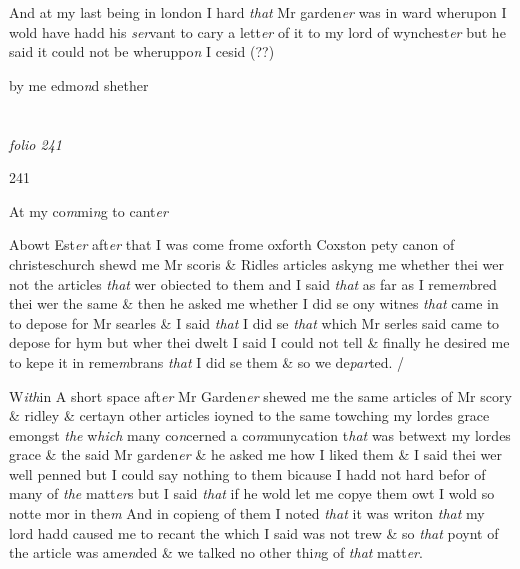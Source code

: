 \documentclass[12pt, a4paper]{book}
\begin{document}
		\ifthenelse{\isodd{\thepage}}
		{\reversemarginpar}
		{\normalmarginpar}
		And at my last being in london I hard \textit{that} Mr garden\textit{er} was in ward
            				wherupon I wold have hadd his \textit{ser}vant to cary a lett\textit{er} of it to my lord of wynchest\textit{er} but he said it could not be wheruppo\textit{n} I cesid (??)


		\ifthenelse{\isodd{\thepage}}
		{\reversemarginpar}
		{\normalmarginpar}
		by me edmo\textit{n}d shether

\dotfill
						\newpage {} \section*{}  \subsection*{}

\textit{folio 241}



\begin{flushright}{\color{Mahogany}241}\end{flushright}

		\ifthenelse{\isodd{\thepage}}
		{\reversemarginpar}
		{\normalmarginpar}
		At my co\textit{m}mi\textit{n}g to cant\textit{er}

            		
		\ifthenelse{\isodd{\thepage}}
		{\reversemarginpar}
		{\normalmarginpar}
		Abowt Est\textit{er} aft\textit{er} that I was come frome oxforth Coxston pety canon of 
            			christeschurch shewd me Mr scoris \& Ridles articles askyng me whether
thei wer not the articles \textit{that} wer obiected to them and I said \textit{that} as 
far as I reme\textit{m}bred thei wer the same \& then he asked me whether
            			I did se ony witnes \textit{that} came in to depose for Mr searles \& I said
\textit{that} I did se \textit{that} which Mr serles said came to depose for hym but 
wher thei dwelt I said I could not tell \& finally he desired me
to kepe it in reme\textit{m}brans \textit{that} I did se them \& so we de\textit{par}ted. /

            		
		\ifthenelse{\isodd{\thepage}}
		{\reversemarginpar}
		{\normalmarginpar}
		W\textit{ith}in A short space aft\textit{er} Mr Garden\textit{er} shewed me the same articles of Mr
	scory \& ridley \& certayn other articles ioyned to the same towching
	my lordes grace emongst \textit{the} w\textit{hich} many co\textit{n}cerned a co\textit{m}munycation t\textit{hat} 
            			was betwext my lordes grace \& the said Mr garden\textit{er} \& he asked me
how I liked them \& I said thei wer well penned but I could say
nothing to them bicause I hadd not hard befor of many of \textit{the} matt\textit{er}s
but I said \textit{that} if he wold let me copye them owt I wold so notte mor in the\textit{m}
And in copieng of them I noted \textit{that} it was writon \textit{that} my lord hadd caused
me to recant the which I said was not trew \& so \textit{that} poynt of the article
was ame\textit{n}ded \& we talked no other thi\textit{n}g of \textit{that} matt\textit{er}.
\end{document}
